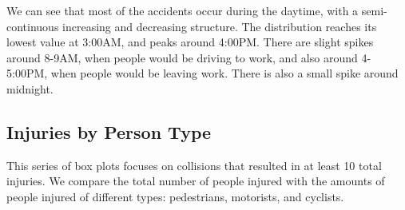 \documentclass[10pt]{article}\usepackage[]{graphicx}\usepackage[]{xcolor}
\begin{document}
We can see that most of the accidents occur during the daytime, with a semi-continuous increasing and decreasing structure. The distribution reaches its lowest value at 3:00AM, and peaks around 4:00PM. There are slight spikes around 8-9AM, when people would be driving to work, and also around 4-5:00PM, when people would be leaving work. There is also a small spike around midnight.

\subsection{Injuries by Person Type}

This series of box plots focuses on collisions that resulted in at least 10 total injuries. We compare the total number of people injured with the amounts of people injured of different types: pedestrians, motorists, and cyclists.
\end{document}

